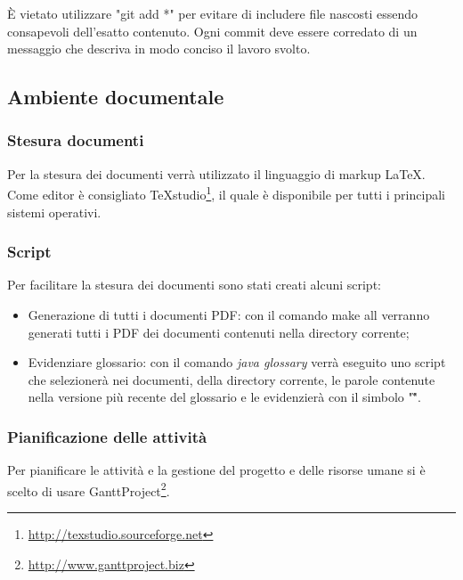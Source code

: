 È vietato utilizzare "git add *" per evitare di includere file nascosti essendo consapevoli dell'esatto contenuto. Ogni commit deve essere corredato di un messaggio che descriva in modo \gls{conciso} il lavoro svolto.

\newpage
\subsection{Ambiente documentale}

\subsubsection{Stesura documenti}

Per la stesura dei documenti verrà utilizzato il \gls{linguaggio di markup} \LaTeX.
Come editor è consigliato TeXstudio\footnote{\url{http://texstudio.sourceforge.net}}, il quale è disponibile per tutti i principali sistemi operativi.

\subsubsection{Script}

Per facilitare la stesura dei documenti sono stati creati alcuni script:

\begin{itemize}
	\item Generazione di tutti i documenti PDF: con il comando make all verranno generati tutti i PDF dei documenti contenuti nella directory corrente;
	\item Evidenziare glossario: con il comando \textit{java glossary} verrà eseguito uno script che selezionerà nei documenti, della directory corrente, le parole contenute nella versione più recente del glossario e le evidenzierà con il simbolo "\G".

\end{itemize}

\subsubsection{Pianificazione delle attività}
Per pianificare le attività e la gestione del progetto e delle risorse umane si è scelto di usare GanttProject\footnote{\url{http://www.ganttproject.biz}}.

